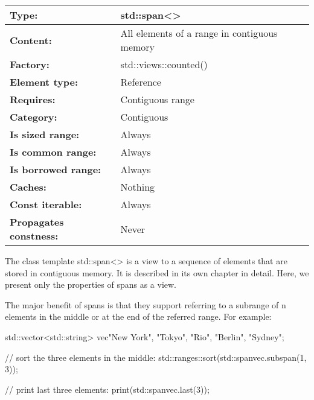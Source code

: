 
\begin{longtable}[c]{|l|l|}
\hline
\textbf{Type:}                 & std::span\textless{}\textgreater{}           \\ \hline
\endfirsthead
%
\endhead
%
\textbf{Content:}              & All elements of a range in contiguous memory \\ \hline
\textbf{Factory:}              & std::views::counted()                        \\ \hline
\textbf{Element type:}         & Reference                                    \\ \hline
\textbf{Requires:}             & Contiguous range                             \\ \hline
\textbf{Category:}             & Contiguous                                   \\ \hline
\textbf{Is sized range:}       & Always                                       \\ \hline
\textbf{Is common range:}      & Always                                       \\ \hline
\textbf{Is borrowed range:}    & Always                                       \\ \hline
\textbf{Caches:}               & Nothing                                      \\ \hline
\textbf{Const iterable:}       & Always                                       \\ \hline
\textbf{Propagates constness:} & Never                                        \\ \hline
\end{longtable}

The class template std::span<> is a view to a sequence of elements that are stored in contiguous memory. It is described in its own chapter in detail. Here, we present only the properties of spans as a view.

The major benefit of spans is that they support referring to a subrange of n elements in the middle or at the end of the referred range. For example:

\begin{cpp}
std::vector<std::string> vec{"New York", "Tokyo", "Rio", "Berlin", "Sydney"};

// sort the three elements in the middle:
std::ranges::sort(std::span{vec}.subspan(1, 3));

// print last three elements:
print(std::span{vec}.last(3));
\end{cpp}


